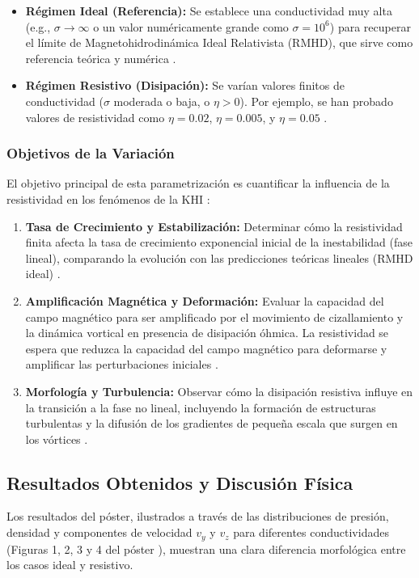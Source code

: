 \begin{itemize}
    \item \textbf{Régimen Ideal (Referencia):} Se establece una conductividad muy alta (e.g., $\sigma \to \infty$ o un valor numéricamente grande como $\sigma = 10^6$) para recuperar el límite de Magnetohidrodinámica Ideal Relativista (RMHD), que sirve como referencia teórica y numérica \cite{338, 425}.
    \item \textbf{Régimen Resistivo (Disipación):} Se varían valores finitos de conductividad ($\sigma$ moderada o baja, o $\eta > 0$). Por ejemplo, se han probado valores de resistividad como $\eta=0.02$, $\eta=0.005$, y $\eta=0.05$ \cite{347, 352}.
\end{itemize}

\subsubsection{Objetivos de la Variación}
El objetivo principal de esta parametrización es cuantificar la influencia de la resistividad en los fenómenos de la KHI \cite{390, 393}:

\begin{enumerate}
    \item \textbf{Tasa de Crecimiento y Estabilización:} Determinar cómo la resistividad finita afecta la tasa de crecimiento exponencial inicial de la inestabilidad (fase lineal), comparando la evolución con las predicciones teóricas lineales (RMHD ideal) \cite{447}.
    \item \textbf{Amplificación Magnética y Deformación:} Evaluar la capacidad del campo magnético para ser amplificado por el movimiento de cizallamiento y la dinámica vortical en presencia de disipación óhmica. La resistividad se espera que reduzca la capacidad del campo magnético para deformarse y amplificar las perturbaciones iniciales \cite{393, 365}.
    \item \textbf{Morfología y Turbulencia:} Observar cómo la disipación resistiva influye en la transición a la fase no lineal, incluyendo la formación de estructuras turbulentas y la difusión de los gradientes de pequeña escala que surgen en los vórtices \cite{349, 393}.
\end{enumerate}

\subsection{Resultados Obtenidos y Discusión Física}

Los resultados del póster, ilustrados a través de las distribuciones de presión, densidad y componentes de velocidad $v_y$ y $v_z$ para diferentes conductividades (Figuras 1, 2, 3 y 4 del póster \cite{391}), muestran una clara diferencia morfológica entre los casos ideal y resistivo.

